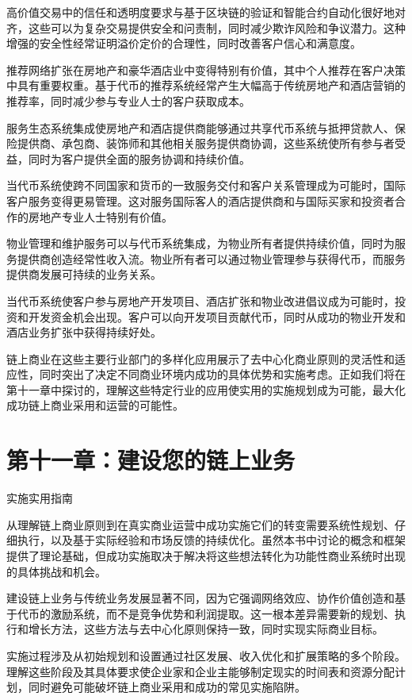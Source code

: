 \documentclass[
  Letterpaper,
]{scrbook}
\begin{document}
高价值交易中的信任和透明度要求与基于区块链的验证和智能合约自动化很好地对齐，这些可以为复杂交易提供安全和问责制，同时减少欺诈风险和争议潜力。这种增强的安全性经常证明溢价定价的合理性，同时改善客户信心和满意度。

推荐网络扩张在房地产和豪华酒店业中变得特别有价值，其中个人推荐在客户决策中具有重要权重。基于代币的推荐系统经常产生大幅高于传统房地产和酒店营销的推荐率，同时减少参与专业人士的客户获取成本。

服务生态系统集成使房地产和酒店提供商能够通过共享代币系统与抵押贷款人、保险提供商、承包商、装饰师和其他相关服务提供商协调，这些系统使所有参与者受益，同时为客户提供全面的服务协调和持续价值。

当代币系统使跨不同国家和货币的一致服务交付和客户关系管理成为可能时，国际客户服务变得更易管理。这对服务国际客人的酒店提供商和与国际买家和投资者合作的房地产专业人士特别有价值。

物业管理和维护服务可以与代币系统集成，为物业所有者提供持续价值，同时为服务提供商创造经常性收入流。物业所有者可以通过物业管理参与获得代币，而服务提供商发展可持续的业务关系。

当代币系统使客户参与房地产开发项目、酒店扩张和物业改进倡议成为可能时，投资和开发资金机会出现。客户可以向开发项目贡献代币，同时从成功的物业开发和酒店业务扩张中获得持续好处。

链上商业在这些主要行业部门的多样化应用展示了去中心化商业原则的灵活性和适应性，同时突出了决定不同商业环境内成功的具体优势和实施考虑。正如我们将在第十一章中探讨的，理解这些特定行业的应用使实用的实施规划成为可能，最大化成功链上商业采用和运营的可能性。

\chapter{第十一章：建设您的链上业务}\label{sec-building-business}

实施实用指南

从理解链上商业原则到在真实商业运营中成功实施它们的转变需要系统性规划、仔细执行，以及基于实际经验和市场反馈的持续优化。虽然本书中讨论的概念和框架提供了理论基础，但成功实施取决于解决将这些想法转化为功能性商业系统时出现的具体挑战和机会。

建设链上业务与传统业务发展显著不同，因为它强调网络效应、协作价值创造和基于代币的激励系统，而不是竞争优势和利润提取。这一根本差异需要新的规划、执行和增长方法，这些方法与去中心化原则保持一致，同时实现实际商业目标。

实施过程涉及从初始规划和设置通过社区发展、收入优化和扩展策略的多个阶段。理解这些阶段及其具体要求使企业家和企业主能够制定现实的时间表和资源分配计划，同时避免可能破坏链上商业采用和成功的常见实施陷阱。
\end{document}
